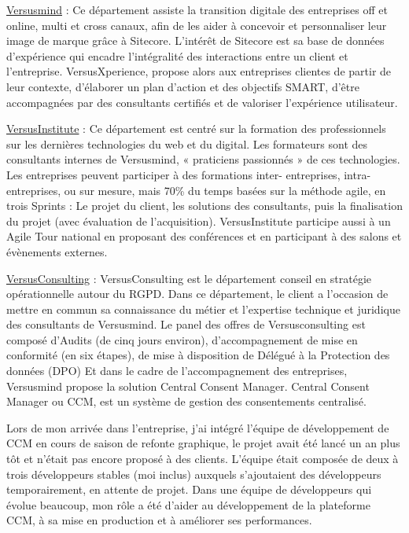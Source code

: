 \documentclass[12pt, a4paper]{report}
\begin{document}
\underline{Versusmind} : Ce département assiste la transition digitale des entreprises off et online, multi et
cross canaux, afin de les aider à concevoir et personnaliser leur image de marque grâce à Sitecore.
L’intérêt de Sitecore est sa base de données d’expérience qui encadre l’intégralité des interactions
entre un client et l’entreprise. VersusXperience, propose alors aux entreprises clientes de partir de leur
contexte, d’élaborer un plan d’action et des objectifs SMART, d’être accompagnées par des consultants
certifiés et de valoriser l’expérience utilisateur.\newline

\underline{VersusInstitute} : Ce département est centré sur la formation des professionnels sur les dernières
technologies du web et du digital. Les formateurs sont des consultants internes de Versusmind,
« praticiens passionnés » de ces technologies. Les entreprises peuvent participer à des formations inter-
entreprises, intra-entreprises, ou sur mesure, mais 70\% du temps basées sur la méthode agile, en trois
Sprints : Le projet du client, les solutions des consultants, puis la finalisation du projet (avec évaluation
de l’acquisition). VersusInstitute participe aussi à un Agile Tour national en proposant des conférences
et en participant à des salons et évènements externes.\newline

\underline{VersusConsulting} : VersusConsulting est le département conseil en stratégie opérationnelle autour du
RGPD. Dans ce département, le client a l’occasion de mettre en commun sa connaissance du métier et
l’expertise technique et juridique des consultants de Versusmind. Le panel des offres de
Versusconsulting est composé d’Audits (de cinq jours environ), d’accompagnement de mise en
conformité (en six étapes), de mise à disposition de Délégué à la Protection des données (DPO)\newline
Et dans le cadre de l'accompagnement des entreprises, Versusmind propose la solution Central Consent Manager.
Central Consent Manager ou CCM, est un système de gestion des consentements centralisé.\newline

Lors de mon arrivée dans l’entreprise, j’ai intégré l’équipe de développement de CCM en cours de
saison de refonte graphique, le projet avait été lancé un an plus tôt et n’était pas encore proposé à des
clients. L’équipe était composée de deux à trois développeurs stables (moi inclus) auxquels s’ajoutaient
des développeurs temporairement, en attente de projet.\newline
Dans une équipe de développeurs qui évolue beaucoup, mon rôle a été d'aider au développement de la plateforme CCM, à sa mise en production et à améliorer ses performances.
\end{document}
